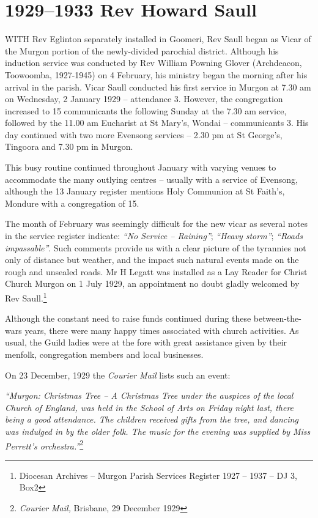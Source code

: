 \printendnotes[custom]
\setcounter{endnote}{0}
\chapter{1929--1933 Rev Howard Saull}
\nobalance


\lettrine[lines=3]{W}{ITH}
 Rev Eglinton separately installed in Goomeri, Rev Saull began as Vicar of the Murgon portion of the newly-divided parochial district. Although his induction service was conducted by Rev William Powning Glover (Archdeacon, Toowoomba, 1927-1945) on 4 February, his ministry began the morning after his arrival in the parish. Vicar Saull conducted his first service in Murgon at 7.30 am on Wednesday, 2 January 1929 -- attendance 3. However, the congregation increased to 15 communicants the following Sunday at the 7.30 am service, followed by the 11.00 am Eucharist at St Mary's, Wondai -- communicants 3. His day continued with two more Evensong services -- 2.30 pm at St George's, Tingoora and 7.30 pm in Murgon.

This busy routine continued throughout January with varying venues to accommodate the many outlying centres -- usually with a service of Evensong, although the 13 January register mentions Holy Communion at St Faith's, Mondure with a congregation of 15.



The month of February was seemingly difficult for the new vicar as several notes in the service register indicate: \emph{``No Service -- Raining''}; \emph{``Heavy storm''}; \emph{``Roads impassable''}. Such comments provide us with a clear picture of the tyrannies not only of distance but weather, and the impact such natural events made on the rough and unsealed roads. Mr H Legatt was installed as a Lay Reader for Christ Church Murgon on 1 July 1929, an appointment no doubt gladly welcomed by Rev Saull.\footnote{Diocesan Archives -- Murgon Parish Services Register 1927 -- 1937 -- DJ 3, Box2}


Although the constant need to raise funds continued during these between-the-wars years, there were many happy times associated with church activities. As usual, the Guild ladies were at the fore with great assistance given by their menfolk, congregation members and local businesses.



On 23 December, 1929 the \emph{Courier Mail} lists such an event:



\emph{``Murgon: Christmas Tree -- A Christmas Tree under the auspices of the local Church of England, was held in the School of Arts on Friday night last, there being a good attendance. The children received gifts from the tree, and dancing was indulged in by the older folk. The music for the evening was supplied by Miss Perrett's orchestra.''}\footnote{\emph{Courier Mail,} Brisbane, 29 December 1929}


